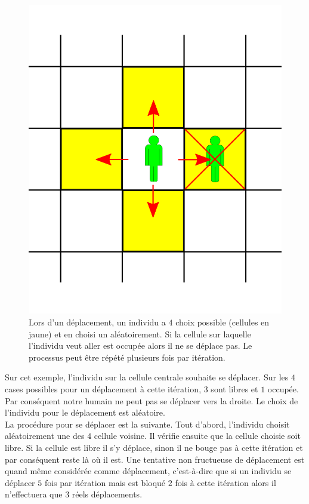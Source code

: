 \begin{figure}[h]
	\centering
	\captionsetup{justification=centering}
	\includegraphics[scale=0.5]{Images/move_available.png}
	\caption[Mouvements des individus]{Lors d'un déplacement, un individu a $4$ choix possible (cellules en jaune) et en choisi un aléatoirement. Si la cellule sur laquelle l'individu veut aller est occupée alors il ne se déplace pas. Le processus peut être répété plusieurs fois par itération.}
\end{figure}

Sur cet exemple, l'individu sur la cellule centrale souhaite se déplacer. Sur les $4$ cases possibles pour un déplacement à cette itération, $3$ sont libres et $1$ occupée. Par conséquent notre humain ne peut pas se déplacer vers la droite. Le choix de l'individu pour le déplacement est aléatoire.\\

La procédure pour se déplacer est la suivante. Tout d'abord, l'individu choisit aléatoirement une des $4$ cellule voisine. Il vérifie ensuite que la cellule choisie soit libre. Si la cellule est libre il s'y déplace, sinon il ne bouge pas à cette itération et par conséquent reste là où il est. Une tentative non fructueuse de déplacement est quand même considérée comme déplacement, c'est-à-dire que si un individu se déplacer $5$ fois par itération mais est bloqué $2$ fois à cette itération alors il n'effectuera que $3$ réels déplacements.

